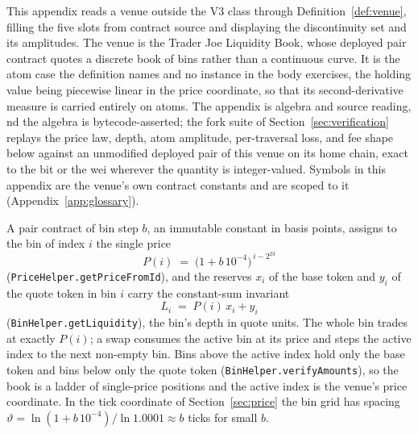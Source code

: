 \documentclass[11pt,a4paper]{article}
\theoremstyle{definition}
\theoremstyle{plain}
\theoremstyle{remark}
\begin{document}
This appendix reads a venue outside the V3 class through Definition~\ref{def:venue}, filling the five slots from contract source and displaying the discontinuity set and its amplitudes. The venue 
is the Trader Joe Liquidity Book,\cite{lb2024} whose deployed pair contract quotes a discrete book of bins rather than a continuous curve. It is the atom case the definition names and no instance 
in the body exercises, the holding value being piecewise linear in the price coordinate, so that its second-derivative measure is carried entirely on atoms. The appendix is algebra and source reading, 
nd the algebra is bytecode-asserted; the fork suite of Section~\ref{sec:verification} replays the price law, depth, atom amplitude, per-traversal loss, and fee shape below against an unmodified 
deployed pair of this venue on its home chain, exact to the bit or the wei wherever the quantity is integer-valued. Symbols in this appendix are the venue's own contract constants and are scoped 
to it (Appendix~\ref{app:glossary}).

A pair contract of bin step $b$, an immutable constant in basis points, assigns to the bin of index $i$ the single price
\[
P(i) \;=\; \big(1 + b\,10^{-4}\big)^{\,i - 2^{23}}
\]
(\texttt{PriceHelper.getPriceFromId}), and the reserves $x_i$ of the base token and $y_i$ of the quote token in bin $i$ carry the constant-sum invariant
\[
L_i \;=\; P(i)\, x_i + y_i
\]
(\texttt{BinHelper.getLiquidity}), the bin's depth in quote units. The whole bin trades at exactly $P(i)$; a swap consumes the active bin at its price and steps the active index to the next 
non-empty bin. Bins above the active index hold only the base token and bins below only the quote token (\texttt{BinHelper.verifyAmounts}), so the book is a ladder of single-price positions 
and the active index is the venue's price coordinate. In the tick coordinate of Section~\ref{sec:price} the bin grid has spacing $\vartheta =
\ln(1+b\,10^{-4})/\ln 1.0001 \approx b$ ticks for small $b$.
\end{document}
